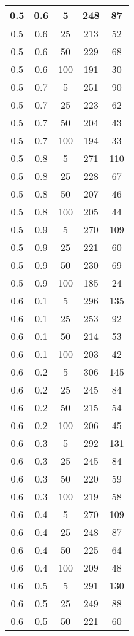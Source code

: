 \begin{appendices}
\begin{center}
\begin{longtable}[c]{|c|c|c|c|c|}
		\hline
		0.5& 0.6& 5& 248&  87\\
		\hline
		0.5& 0.6& 25& 213&  52\\
		\hline
		0.5& 0.6& 50& 229&  68\\
		\hline
		0.5& 0.6& 100& 191&  30\\
		\hline
		0.5& 0.7& 5& 251&  90\\
		\hline
		0.5& 0.7& 25& 223&  62\\
		\hline
		0.5& 0.7& 50& 204&  43\\
		\hline
		0.5& 0.7& 100& 194&  33\\
		\hline
		0.5& 0.8& 5& 271&  110\\
		\hline
		0.5& 0.8& 25& 228&  67\\
		\hline
		0.5& 0.8& 50& 207&  46\\
		\hline
		0.5& 0.8& 100& 205&  44\\
		\hline
		0.5& 0.9& 5& 270&  109\\
		\hline
		0.5& 0.9& 25& 221&  60\\
		\hline
		0.5& 0.9& 50& 230&  69\\
		\hline
		0.5& 0.9& 100& 185&  24\\
		\hline
		0.6& 0.1& 5& 296&  135\\
		\hline
		0.6& 0.1& 25& 253&  92\\
		\hline
		0.6& 0.1& 50& 214&  53\\
		\hline
		0.6& 0.1& 100& 203&  42\\
		\hline
		0.6& 0.2& 5& 306&  145\\
		\hline
		0.6& 0.2& 25& 245&  84\\
		\hline
		0.6& 0.2& 50& 215&  54\\
		\hline
		0.6& 0.2& 100& 206&  45\\
		\hline
		0.6& 0.3& 5& 292&  131\\
		\hline
		0.6& 0.3& 25& 245&  84\\
		\hline
		0.6& 0.3& 50& 220&  59\\
		\hline
		0.6& 0.3& 100& 219&  58\\
		\hline
		0.6& 0.4& 5& 270&  109\\
		\hline
		0.6& 0.4& 25& 248&  87\\
		\hline
		0.6& 0.4& 50& 225&  64\\
		\hline
		0.6& 0.4& 100& 209&  48\\
		\hline
		0.6& 0.5& 5& 291&  130\\
		\hline
		0.6& 0.5& 25& 249&  88\\
		\hline
		0.6& 0.5& 50& 221&  60\\

\end{longtable}
\end{center}
\end{appendices}
